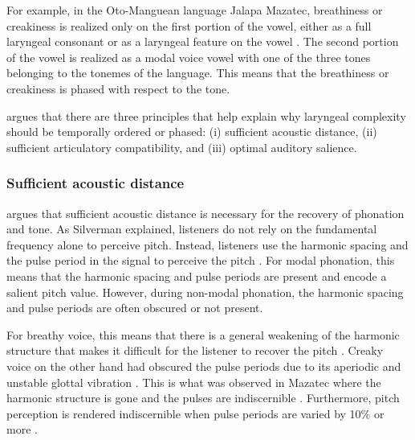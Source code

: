 For example, in the Oto-Manguean language Jalapa Mazatec, breathiness or creakiness is realized only on the first portion of the vowel, either as a full laryngeal consonant or as a laryngeal feature on the vowel \citep[238]{silvermanLaryngealComplexityOtomanguean1997}. The second portion of the vowel is realized as a modal voice vowel with one of the three tones belonging to the tonemes of the language. This means that the breathiness or creakiness is phased with respect to the tone.

\citeauthor{silvermanLaryngealComplexityOtomanguean1997} argues that there are three principles that help explain why laryngeal complexity should be temporally ordered or phased: (i) sufficient acoustic distance, (ii) sufficient articulatory compatibility, and (iii) optimal auditory salience. 

\subsubsection{Sufficient acoustic distance}\label{sec:sufficient_acoustic_distance}

\citet{silvermanLaryngealComplexityOtomanguean1997} argues that sufficient acoustic distance is necessary for the recovery of phonation and tone. As Silverman explained, listeners do not rely on the fundamental frequency alone to perceive pitch. Instead, listeners use the harmonic spacing and the pulse period in the signal to perceive the pitch \citep{ritsmaFrequenciesDominantPerception1967,remezIntonationSinusoidalSentences1993}. For modal phonation, this means that the harmonic spacing and pulse periods are present and encode a salient pitch value. However, during non-modal phonation, the harmonic spacing and pulse periods are often obscured or not present.

For breathy voice, this means that there is a general weakening
of the harmonic structure that makes it difficult for the listener to recover the pitch \citep{silvermanPhasingRecoverability1997}. Creaky voice on the other hand had obscured the pulse periods due to its aperiodic and unstable glottal vibration \citep{ladefogedSoundsWorldsLanguages1996}. This is what was observed in Mazatec where the harmonic structure is gone and the pulses are indiscernible \citep{kirkQuantifyingAcousticProperties1993}. Furthermore, pitch perception is rendered indiscernible when pulse periods are varied by 10\% or more \citep{rosenbergPitchDiscriminationJittered1966}.

